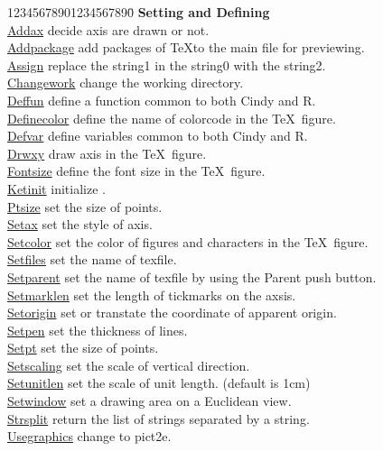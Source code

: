 \documentclass[papersize,a4paper,12pt]{article}
\begin{document}
\begin{tabbing}
12345678901234567890\=\kill
{\bf Setting and Defining} \> \\
\hyperlink{addax}{Addax} \> decide axis are drawn or not.\\
\hyperlink{addpackage}{Addpackage} \> add packages of \TeX to the main file  for previewing.\\
\hyperlink{assign}{Assign} \> replace the string1 in the string0 with the string2.\\
\hyperlink{changework}{Changework} \> change the working directory.\\
\hyperlink{deffun}{Deffun} \> define a function common to both Cindy and R.\\
\hyperlink{definecolor}{Definecolor} \> define the name of colorcode in the \TeX\ figure.\\
\hyperlink{defvar}{Defvar} \> define variables common to both Cindy and R.\\
\hyperlink{drwxy}{Drwxy} \> draw axis in the \TeX\ figure.\\
\hyperlink{fontsize}{Fontsize} \> define the font size in the \TeX\ figure.\\
\hyperlink{ketinit}{Ketinit} \> initialize \ketcindy.\\
\hyperlink{ptsize}{Ptsize}  \> set the size of points.\\
\hyperlink{setax}{Setax} \> set the style of axis.\\
\hyperlink{setcolor}{Setcolor} \> set the color of figures and characters in the \TeX\ figure.\\
\hyperlink{setfiles}{Setfiles} \> set the name of texfile.\\
\hyperlink{setparent}{Setparent} \> set the name of texfile by using the Parent push button.\\
\hyperlink{setmarklen}{Setmarklen} \> set the length of tickmarks on the axsis.\\
\hyperlink{setorigin}{Setorigin} \> set or transtate the coordinate of apparent origin.\\
\hyperlink{setpen}{Setpen} \> set the thickness of lines.\\
\hyperlink{setpt}{Setpt} \> set the size of points.\\
\hyperlink{setscaling}{Setscaling} \> set the scale of vertical direction.\\
\hyperlink{setunitlen}{Setunitlen} \> set the scale of unit length. (default is 1cm)\\
\hyperlink{setwindow}{Setwindow} \> set a drawing area on a Euclidean view.\\
\hyperlink{strsplit}{Strsplit} \> return the list of strings separated by a string.\\
\hyperlink{usegraphics}{Usegraphics} \> change to pict2e.\\


\end{tabbing}
\end{document}
